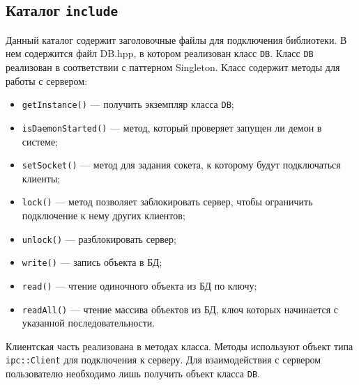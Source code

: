 \subsection{Каталог \texttt{include}}
Данный каталог содержит заголовочные файлы для подключения библиотеки. В нем содержится файл DB.hpp, в котором реализован класс \texttt{DB}. Класс \texttt{DB} реализован в соответствии с паттерном Singleton\cite{patterns}. Класс содержит методы для работы с сервером:
\begin{itemize}
\item \texttt{getInstance()} --- получить экземпляр класса \texttt{DB};
\item \texttt{isDaemonStarted()} --- метод, который проверяет запущен ли демон в системе;
\item \texttt{setSocket()} --- метод для задания сокета, к которому будут подключаться клиенты;
\item \texttt{lock()} --- метод позволяет заблокировать сервер, чтобы ограничить подключение к нему других клиентов;
\item \texttt{unlock()} --- разблокировать сервер;
\item \texttt{write()} --- запись объекта в БД;
\item \texttt{read()} --- чтение одиночного объекта из БД по ключу;
\item \texttt{readAll()} --- чтение массива объектов из БД, ключ которых начинается с указанной последовательности.
\end{itemize}
Клиентская часть реализована в методах класса. Методы используют объект типа \texttt{ipc::Client} для подключения к серверу. Для взаимодействия с сервером пользователю необходимо лишь получить объект класса \texttt{DB}.


